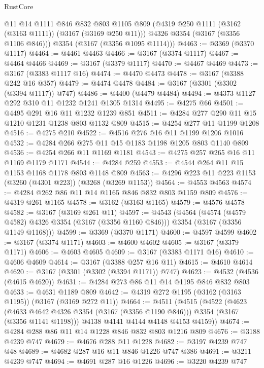 \begin{lexlean}{RustCore}
\begin{coremodule}
        @11
        @14
        @1111
        @846
        @832
        @803
        @1105
        @809
        (@4319 @250 @1111 (@3162 (@3163 @1111)) (@3167 (@3169 @250 @11)))
        @4326
        @3354
        (@3167 (@3356 @1106 @846)))
      @3354
      (@3167 (@3356 @1095 @1114)))
@4463 := @3369 (@3370 @1117)
@4464 := @4461 @4463
@4466 := @3167 (@3374 @1117)
@4467 := @4464 @4466
@4469 := @3167 (@3379 @1117)
@4470 := @4467 @4469
@4473 := @3167 (@3383 @1117 @16)
@4474 := @4470 @4473
@4478 := @3167 (@3388 @242 @16 @357)
@4479 := @4474 @4478
@4484 := @3167 (@3301 (@3302 (@3394 @1117)) @747)
@4486 := @4400 (@4479 @4484)
@4494 := @4373 @1127 @292 @310 @11 @1232 @1241 @1305 @1314
@4495 := @4275 @66
@4501 := @4495 @291 @16 @11 @1232 @1239 @851
@4511 := @4284 @277 @290 @11 @15 @1210 @1231 @1238 @803 @1132 @809
@4515 := @4254 @277 @11 @1199 @1208
@4516 := @4275 @210
@4522 := @4516 @276 @16 @11 @1199 @1206 @1016
@4532 := @4284 @266 @275 @11 @15 @1183 @1198 @1205 @803 @1140 @809
@4536 := @4254 @266 @11 @1169 @1181
@4543 := @4275 @257 @265 @16 @11 @1169 @1179 @1171
@4544 := @4284 @259
@4553 := @4544 @264 @11 @15 @1153 @1168 @1178 @803 @1148 @809
@4563 := @4296 @223 @11 @223 @1153 (@3260 (@4301 @223)) (@3268 (@3269 @1153))
@4564 := @4553 @4563
@4574 := @4284 @262 @86 @11 @14 @1165 @846 @832 @803 @1159 @809
@4576 := @4319 @261 @1165
@4578 := @3162 (@3163 @1165)
@4579 := @4576 @4578
@4582 := @3167 (@3169 @261 @11)
@4597 := @4543
    (@4564
      (@4574 (@4579 @4582) @4326 @3354 (@3167 (@3356 @1160 @846)))
      @3354
      (@3167 (@3356 @1149 @1168)))
@4599 := @3369 (@3370 @1171)
@4600 := @4597 @4599
@4602 := @3167 (@3374 @1171)
@4603 := @4600 @4602
@4605 := @3167 (@3379 @1171)
@4606 := @4603 @4605
@4609 := @3167 (@3383 @1171 @16)
@4610 := @4606 @4609
@4614 := @3167 (@3388 @257 @16 @11)
@4615 := @4610 @4614
@4620 := @3167 (@3301 (@3302 (@3394 @1171)) @747)
@4623 := @4532 (@4536 (@4615 @4620))
@4631 := @4284 @273 @86 @11 @14 @1195 @846 @832 @803
@4633 := @4631 @1189 @809
@4642 := @4319 @272 @1195 (@3162 (@3163 @1195)) (@3167 (@3169 @272 @11))
@4664 := @4511
    (@4515
      (@4522
        (@4623
          (@4633 @4642 @4326 @3354 (@3167 (@3356 @1190 @846)))
          @3354
          (@3167 (@3356 @1141 @1198)))
        @4138
        @4141
        @4144
        @4148
        @4153
        @4159))
@4674 := @4284 @288 @86 @11 @14 @1228 @846 @832 @803 @1216 @809
@4676 := @3188 @4239 @747
@4679 := @4676 @288 @11 @1228
@4682 := @3197 @4239 @747 @48
@4689 := @4682 @287 @16 @11 @846 @1226 @747 @386
@4691 := @3211 @4239 @747
@4694 := @4691 @287 @16 @1226
@4696 := @3220 @4239 @747

\end{coremodule}
\end{lexlean}
